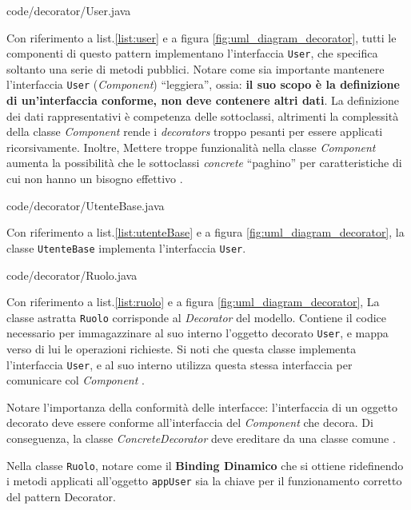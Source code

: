 \documentclass[12pt]{article}
\begin{document}

{code/decorator/User.java}

Con riferimento a list.\ref{list:user} e a figura \ref{fig:uml_diagram_decorator}, tutti le componenti di questo pattern implementano l’interfaccia
{\tt User}, che specifica soltanto una serie di metodi pubblici.
Notare come sia importante mantenere l'interfaccia {\tt User} ({\em Component}) ``leggiera'', ossia: \textbf{il suo scopo è la definizione di un'interfaccia conforme, non deve contenere altri dati}. La definizione dei dati rappresentativi è competenza delle sottoclassi, altrimenti la complessità della classe {\em Component} rende i {\em decorators} troppo pesanti per essere applicati ricorsivamente. Inoltre, Mettere troppe funzionalità nella classe {\em Component} aumenta la possibilità che le sottoclassi {\em concrete} ``paghino'' per caratteristiche di cui non hanno un bisogno effettivo \cite{gof_riferimento}.


{code/decorator/UtenteBase.java}

Con riferimento a list.\ref{list:utenteBase} e a figura \ref{fig:uml_diagram_decorator}, la classe {\tt UtenteBase} implementa l'interfaccia {\tt User}.


{code/decorator/Ruolo.java}

Con riferimento a list.\ref{list:ruolo} e a figura \ref{fig:uml_diagram_decorator}, 
La classe astratta {\tt Ruolo} corrisponde al {\em Decorator} del
modello. Contiene il codice necessario per immagazzinare al suo interno
l’oggetto decorato {\tt User}, e mappa verso di lui le operazioni richieste. Si noti che questa classe implementa l’interfaccia {\tt User}, e al suo interno utilizza questa stessa interfaccia per comunicare col {\em Component} \cite{gof_sunt}.

Notare l'importanza della conformità delle interfacce: l'interfaccia di un oggetto decorato deve essere conforme all'interfaccia del {\em Component} che decora. Di conseguenza, la classe {\em ConcreteDecorator} deve ereditare da una classe comune \cite{gof_riferimento}.

Nella classe {\tt Ruolo}, notare come il \textbf{Binding Dinamico} che si ottiene ridefinendo i metodi applicati all'oggetto {\tt appUser} sia la chiave per il funzionamento corretto del pattern Decorator.
\end{document}

